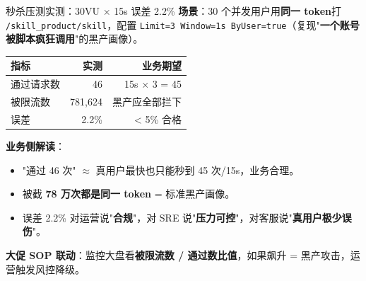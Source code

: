 \documentclass[aspectratio=169,11pt]{beamer}
\begin{document}
\begin{frame}[shrink]{秒杀压测实测：30VU × 15s 误差 2.2\%}
\textbf{场景}：30 个并发用户用\textbf{同一 token}打 \texttt{/skill\_product/skill}，配置 \texttt{Limit=3 Window=1s ByUser=true}（复现"\textbf{一个账号被脚本疯狂调用}"的黑产画像）。

\vspace{2mm}
\begin{tabular}{@{}lrr@{}}
\toprule
指标 & 实测 & 业务期望 \\
\midrule
通过请求数 & 46  & 15s × 3 = 45 \\
被限流数   & 781{,}624 & 黑产应全部拦下 \\
误差       & 2.2\% & < 5\% 合格 \\
\bottomrule
\end{tabular}
\vspace{3mm}

\small \textbf{业务侧解读}：
\begin{itemize}\itemsep0pt
  \item "通过 46 次" $\approx$ 真用户最快也只能秒到 45 次/15s，业务合理。
  \item 被截 \textbf{78 万次都是同一 token} = 标准黑产画像。
  \item 误差 2.2\% 对运营说"\textbf{合规}"，对 SRE 说"\textbf{压力可控}"，对客服说"\textbf{真用户极少误伤}"。
\end{itemize}
\textbf{大促 SOP 联动}：监控大盘看\textbf{被限流数 / 通过数比值}，如果飙升 = 黑产攻击，运营触发风控降级。
\end{frame}
\end{document}
